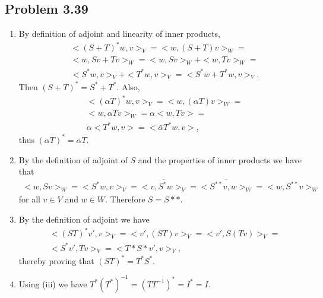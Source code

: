\documentclass[letterpaper,12pt]{article}
\theoremstyle{definition}
\begin{document}
\begin{spacing}{1.3}{}
\subsection*{Problem 3.39}
\begin{enumerate}
    \item 
    	By definition of adjoint and linearity of inner products,
	\begin{align*}
	&<(S+T)^*w,v>_V=
	<w,(S+T)v>_W=\\
	&<w,Sv+Tv>_W=
	<w,Sv>_W+<w,Tv>_W=\\
	&<S^*w,v>_V + <T^*w,v>_V=
	<S^*w+T^*w,v>_V.
	\end{align*}
	Then $(S+T)^*=S^*+T^*$.
	Also,
	\begin{align*}
	&<(\alpha T)^*w,v>_V=
	<w,(\alpha T)v>_W=\\
	&<w,\alpha Tv>_W=
	\alpha<w, Tv>=\\
	&\alpha<T^*w,v>=
	<\bar{\alpha}T^*w,v>,
	\end{align*}
	thus $(\alpha T)^*=\bar{\alpha}T$. \\
	\item
	By the definition of adjoint of $S$ and the properties of inner products we have that
	\begin{align*}
	<w,Sv>_W=<S^*w,v>_V=
	\overline{<v,S^*w>_V}=\overline{<S^{**}v,w>_W}=
	<w,S^{**}v>_W
	\end{align*}
	for all $v\in V$ and $w\in W$.
	Therefore $S=S**$. \\
	\item
	By the definition of adjoint we have
	\begin{align*}
	&<(ST)^*v',v>_V=<v',(ST)v>_V=<v',S(Tv)>_V=\\
	&<S^*v',Tv>_V=<T*S*v',v>_V,
	\end{align*}
	thereby proving that $(ST)^*=T^*S^*$.
	\item
		Using (iii) we have $T^*(T^*)^{-1}=(TT^{-1})^*=I^*=I$. \\
\end{enumerate}

	

\end{spacing}
\end{document}
